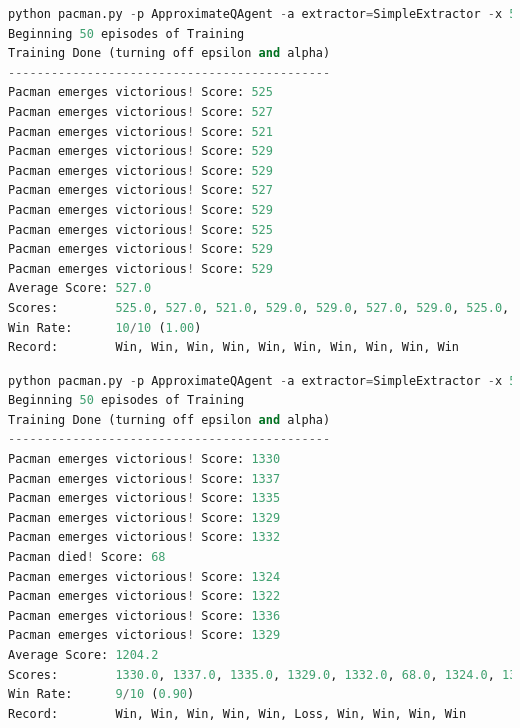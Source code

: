 \documentclass{report}
\begin{document}
\begin{lstlisting}[language=Python, caption=Q-Learning aproximado]
python pacman.py -p ApproximateQAgent -a extractor=SimpleExtractor -x 50 -n 60 -l mediumGrid      
Beginning 50 episodes of Training
Training Done (turning off epsilon and alpha)
---------------------------------------------
Pacman emerges victorious! Score: 525
Pacman emerges victorious! Score: 527
Pacman emerges victorious! Score: 521
Pacman emerges victorious! Score: 529
Pacman emerges victorious! Score: 529
Pacman emerges victorious! Score: 527
Pacman emerges victorious! Score: 529
Pacman emerges victorious! Score: 525
Pacman emerges victorious! Score: 529
Pacman emerges victorious! Score: 529
Average Score: 527.0
Scores:        525.0, 527.0, 521.0, 529.0, 529.0, 527.0, 529.0, 525.0, 529.0, 529.0
Win Rate:      10/10 (1.00)
Record:        Win, Win, Win, Win, Win, Win, Win, Win, Win, Win
\end{lstlisting}
\begin{lstlisting}[language=Python, caption=Q-Learning aproximado]
python pacman.py -p ApproximateQAgent -a extractor=SimpleExtractor -x 50 -n 60 -l mediumClassic
Beginning 50 episodes of Training
Training Done (turning off epsilon and alpha)
---------------------------------------------
Pacman emerges victorious! Score: 1330
Pacman emerges victorious! Score: 1337
Pacman emerges victorious! Score: 1335
Pacman emerges victorious! Score: 1329
Pacman emerges victorious! Score: 1332
Pacman died! Score: 68
Pacman emerges victorious! Score: 1324
Pacman emerges victorious! Score: 1322
Pacman emerges victorious! Score: 1336
Pacman emerges victorious! Score: 1329
Average Score: 1204.2
Scores:        1330.0, 1337.0, 1335.0, 1329.0, 1332.0, 68.0, 1324.0, 1322.0, 1336.0, 1329.0
Win Rate:      9/10 (0.90)
Record:        Win, Win, Win, Win, Win, Loss, Win, Win, Win, Win
\end{lstlisting}
\end{document}
